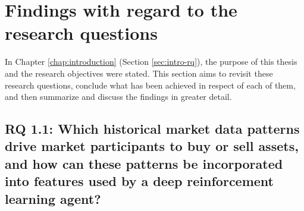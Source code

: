 \section{Findings with regard to the research questions}

In Chapter \ref{chap:introduction} (Section \ref{sec:intro-rq}), the purpose of this thesis and the research objectives were stated.
This section aims to revisit these research questions, conclude what has been achieved in respect of each of them, and then summarize and discuss the findings in greater detail.

\subsection{RQ 1.1: Which historical market data patterns drive market participants to buy or sell assets, and how can these patterns be incorporated into features used by a deep reinforcement learning agent?}

